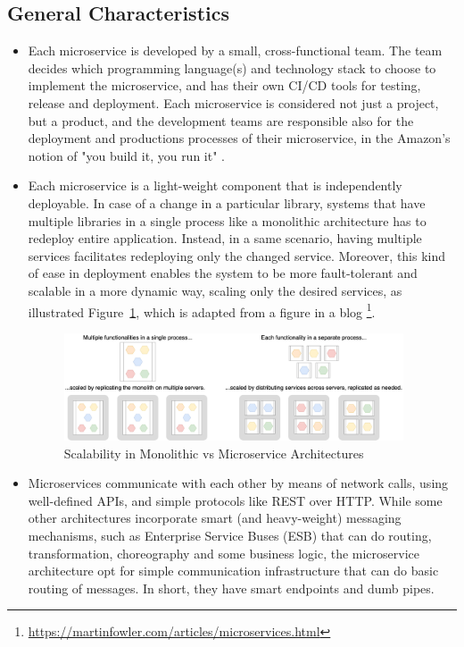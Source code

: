 \documentclass{Configuration_Files/PoliMi3i_thesis}
\begin{document}
\subsection{General Characteristics}
\label{subsec:chars}

\begin{itemize}
    \item Each microservice is developed by a small, cross-functional team.
    The team decides which programming language(s) and technology stack to choose to implement the microservice, and has their own CI/CD tools for testing, release and deployment.
    Each microservice is considered not just a project, but a product, and the development teams are responsible also for the deployment and productions processes of their microservice, in the Amazon's notion of "you build it, you run it" \cite{youbuild}.
    
    \item Each microservice is a light-weight component that is independently deployable. In case of a change in a particular library, systems that have multiple libraries in a single process like a monolithic architecture has to redeploy entire application. Instead, in a same scenario, having multiple services facilitates redeploying only the changed service. Moreover, this kind of ease in deployment enables the system to be more fault-tolerant and scalable in a more dynamic way, scaling only the desired services, as illustrated Figure~\ref{fig:scalability}, which is adapted from a figure in a blog \footnote{\href{https://martinfowler.com/articles/microservices.html}{https://martinfowler.com/articles/microservices.html}}.
    
    \begin{figure}[H]
    \centering
    \includegraphics[width=0.95\textwidth]{myImages/scalability.png}
    \caption{Scalability in Monolithic vs Microservice Architectures}
    \label{fig:scalability}
    \end{figure}

    \item Microservices communicate with each other by means of network calls, using well-defined APIs, and simple protocols like REST over HTTP. While some other architectures incorporate smart (and heavy-weight) messaging mechanisms, such as Enterprise Service Buses (ESB) that can do routing, transformation, choreography and some business logic, the microservice architecture opt for simple communication infrastructure that can do basic routing of messages. In short, they have smart endpoints and dumb pipes.
    

\end{itemize}
\end{document}
